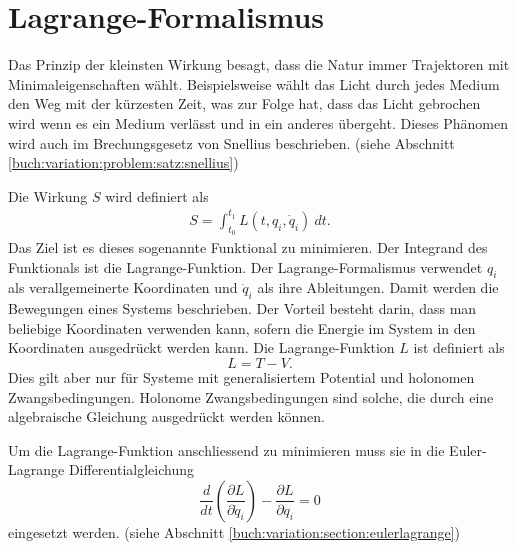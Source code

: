 \section{Lagrange-Formalismus}
Das Prinzip der kleinsten Wirkung besagt, dass die Natur immer Trajektoren
mit Minimaleigenschaften wählt.
Beispielsweise wählt das Licht durch jedes Medium den Weg mit der kürzesten Zeit, was zur Folge hat,
dass das Licht gebrochen wird wenn es ein Medium verlässt und in ein anderes übergeht.
Dieses Phänomen wird auch im Brechungsgesetz von Snellius beschrieben.
(siehe Abschnitt \ref{buch:variation:problem:satz:snellius})

Die Wirkung \(S\) wird definiert als
\begin{align*}
    S = \int_{t_0}^{t_1} L(t,q_i,\dot{q}_i) \: dt.
\end{align*}
Das Ziel ist es dieses sogenannte Funktional zu minimieren.
Der Integrand des Funktionals ist die Lagrange-Funktion.
Der Lagrange-Formalismus verwendet \(q_i\) als verallgemeinerte Koordinaten
und \(\dot{q}_i\) als ihre Ableitungen.
Damit werden die Bewegungen eines Systems beschrieben.
Der Vorteil besteht darin, dass man beliebige Koordinaten verwenden kann,
sofern die Energie im System in den Koordinaten ausgedrückt werden kann.
Die Lagrange-Funktion \(L\) ist definiert als
\begin{equation}
    L = T - V.
    \label{eq:lagrange} 
\end{equation}
Dies gilt aber nur für Systeme mit generalisiertem Potential und holonomen Zwangsbedingungen.
Holonome Zwangsbedingungen sind solche, die durch eine algebraische Gleichung
ausgedrückt werden können.%

Um die Lagrange-Funktion anschliessend zu minimieren muss sie in die
Euler-Lagrange Differentialgleichung
\begin{equation*}
    \frac{d}{dt} \left( \frac{\partial L}{\partial \dot{q}_i} \right) 
    - \frac{\partial L}{\partial q_i} = 0
\end{equation*}
eingesetzt werden.
(siehe Abschnitt \ref{buch:variation:section:eulerlagrange})




